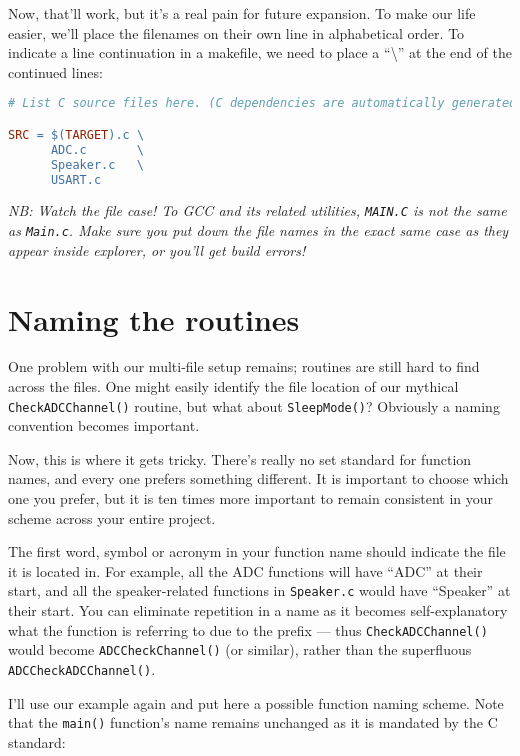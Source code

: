 \documentclass[a4paper,oneside,notitlepage]{article}
\begin{document}
Now, that'll work, but it's a real pain for future expansion. To make our life easier, we'll place the filenames on their own line in alphabetical order. To indicate a line continuation in a makefile, we need to place a ``\textbackslash'' at the end of the continued lines:

\begin{center}
\begin{lstlisting}[language=make]
# List C source files here. (C dependencies are automatically generated.)

SRC = $(TARGET).c \
      ADC.c       \
      Speaker.c   \
      USART.c
\end{lstlisting}
\end{center}

\textit{NB: Watch the file case! To GCC and its related utilities, \texttt{MAIN.C} is not the same as \texttt{Main.c}. Make sure you put down the file names in the exact same case as they appear inside explorer, or you'll get build errors!}

\section{Naming the routines}

One problem with our multi-file setup remains; routines are still hard to find across the files. One might easily identify the file location of our mythical \texttt{CheckADCChannel()} routine, but what about \texttt{SleepMode()}? Obviously a naming convention becomes important.

Now, this is where it gets tricky. There's really no set standard for function names, and every one prefers something different. It is important to choose which one you prefer, but it is ten times more important to remain consistent in your scheme across your entire project.

The first word, symbol or acronym in your function name should indicate the file it is located in. For example, all the ADC functions will have ``ADC'' at their start, and all the speaker-related functions in \texttt{Speaker.c} would have ``Speaker'' at their start. You can eliminate repetition in a name as it becomes self-explanatory what the function is referring to due to the prefix --- thus \texttt{CheckADCChannel()} would become \texttt{ADCCheckChannel()} (or similar), rather than the superfluous \texttt{ADCCheckADCChannel()}.

I'll use our example again and put here a possible function naming scheme. Note that the \texttt{main()} function's name remains unchanged as it is mandated by the C standard:
\end{document}
